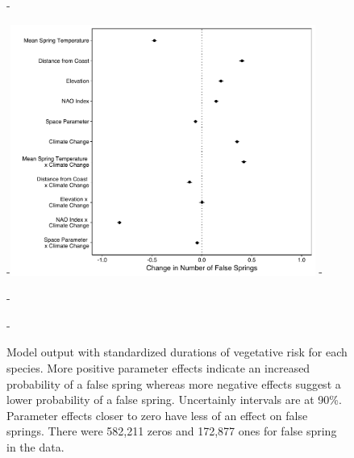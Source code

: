 \documentclass{article}\usepackage[]{graphicx}\usepackage[]{color}
\begin{document}
  
{\begin{figure} [H]
  -\begin{center}
  -\includegraphics[width=10cm]{..//figures/model_output_90.pdf}
  -\caption{Model output with standardized durations of vegetative risk for each species. More positive parameter effects indicate an increased probability of a false spring whereas more negative effects suggest a lower probability of a false spring. Uncertainly intervals are at 90\%. Parameter effects closer to zero have less of an effect on false springs. There were 582,211 zeros and 172,877 ones for false spring in the data.}\label{fig:maineffects}
  -\end{center}
  -\end{figure}}


  
\end{document}
